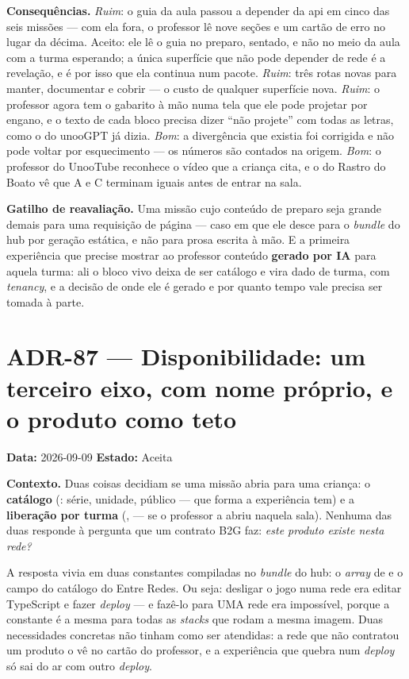 \textbf{Consequências.} \emph{Ruim}: o guia da aula passou a depender da api em
cinco das seis missões --- com ela fora, o professor lê nove seções e um cartão
de erro no lugar da décima. Aceito: ele lê o guia no preparo, sentado, e não no
meio da aula com a turma esperando; a única superfície que não pode depender de
rede é a revelação, e é por isso que ela continua num pacote. \emph{Ruim}: três
rotas novas para manter, documentar e cobrir --- o custo de qualquer superfície
nova. \emph{Ruim}: o professor agora tem o gabarito à mão numa tela que ele pode
projetar por engano, e o texto de cada bloco precisa dizer ``não projete'' com
todas as letras, como o do unooGPT já dizia. \emph{Bom}: a divergência que
existia foi corrigida e não pode voltar por esquecimento --- os números são
contados na origem. \emph{Bom}: o professor do UnooTube reconhece o vídeo que a
criança cita, e o do Rastro do Boato vê que A e C terminam iguais antes de
entrar na sala.

\textbf{Gatilho de reavaliação.} Uma missão cujo conteúdo de preparo seja grande
demais para uma requisição de página --- caso em que ele desce para o
\emph{bundle} do hub por geração estática, e não para prosa escrita à mão. E a
primeira experiência que precise mostrar ao professor conteúdo \textbf{gerado
por IA} para aquela turma: ali o bloco vivo deixa de ser catálogo e vira dado de
turma, com \emph{tenancy}, e a decisão de onde ele é gerado e por quanto tempo
vale precisa ser tomada à parte.

\section{ADR-87 --- Disponibilidade: um terceiro eixo, com nome próprio, e o
produto como teto}

\textbf{Data:} 2026-09-09 \quad \textbf{Estado:} Aceita

\textbf{Contexto.} Duas coisas decidiam se uma missão abria para uma criança: o
\textbf{catálogo} (: série, unidade, público --- que forma a
experiência tem) e a \textbf{liberação por turma} (,
 --- se o professor a abriu naquela sala). Nenhuma das duas responde
à pergunta que um contrato B2G faz: \emph{este produto existe nesta rede?}

A resposta vivia em duas constantes compiladas no \emph{bundle} do hub: o
\emph{array}  de  e o campo
 do catálogo do Entre Redes. Ou seja:
desligar o jogo numa rede era editar TypeScript e fazer \emph{deploy} --- e
fazê-lo para UMA rede era impossível, porque a constante é a mesma para todas as
\emph{stacks} que rodam a mesma imagem. Duas necessidades concretas não tinham
como ser atendidas: a rede que não contratou um produto o vê no cartão do
professor, e a experiência que quebra num \emph{deploy} só sai do ar com outro
\emph{deploy}.

